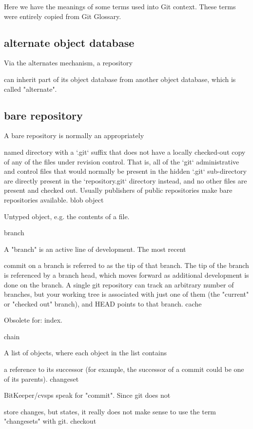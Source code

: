 Here we have the meanings of some terms used into Git context.
These terms were entirely copied from Git Glossary.
\subsection*{alternate object database}

\textcolor{light-gray}{Via the alternates mechanism, a repository}

can inherit part of its object database
from another object database, which is called "alternate". 

\subsection*{bare repository}

A bare repository is normally an appropriately

named directory with a `.git` suffix that does not
have a locally checked-out copy of any of the files under
revision control. That is, all of the `git`
administrative and control files that would normally be present in the
hidden `.git` sub-directory are directly present in the
`repository.git` directory instead,
and no other files are present and checked out. Usually publishers of
public repositories make bare repositories available.
blob object

Untyped object, e.g. the contents of a file.

branch

A "branch" is an active line of development. The most recent

commit on a branch is referred to as the tip of
that branch.  The tip of the branch is referenced by a branch
head, which moves forward as additional development
is done on the branch.  A single git
repository can track an arbitrary number of
branches, but your working tree is
associated with just one of them (the "current" or "checked out"
branch), and HEAD points to that branch.
cache

Obsolete for: index.

chain

A list of objects, where each object in the list contains

a reference to its successor (for example, the successor of a
commit could be one of its parents).
changeset

BitKeeper/cvsps speak for "commit". Since git does not

store changes, but states, it really does not make sense to use the term
"changesets" with git.
checkout

